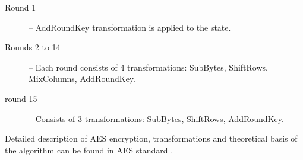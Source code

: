 \begin{description}
\item[Round 1] -- AddRoundKey transformation is applied to the state.
\item[Rounds 2 to 14] -- Each round consists of 4 transformations: SubBytes, ShiftRows, MixColumns, AddRoundKey.
\item[round 15] -- Consists of 3 transformations: SubBytes, ShiftRows, AddRoundKey.
\end{description}

Detailed description of AES encryption, transformations and theoretical basis of the algorithm can be found in AES standard \cite{aes-standard}.







